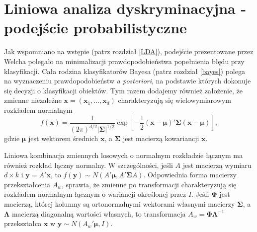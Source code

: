 \documentclass[]{book}
\theoremstyle{plain}
\theoremstyle{definition}
\theoremstyle{definition}
\theoremstyle{definition}
\theoremstyle{definition}
\theoremstyle{remark}
\let\BeginKnitrBlock\begin \let\EndKnitrBlock\end
\begin{document}
\hypertarget{liniowa-analiza-dyskryminacyjna---podejscie-probabilistyczne}{%
\section{Liniowa analiza dyskryminacyjna - podejście probabilistyczne}\label{liniowa-analiza-dyskryminacyjna---podejscie-probabilistyczne}}

Jak wspomniano na wstępie (patrz rozdział \ref{LDA}), podejście prezentowane przez Welcha polegało na minimalizacji prawdopodobieństwa popełnienia błędu przy klasyfikacji. Cała rodzina klasyfikatorów Bayesa (patrz rozdział \ref{bayes}) polega na wyznaczeniu prawdopodobieństw \emph{a posteriori}, na podstawie których dokonuje się decyzji o klasyfikacji obiektów. Tym razem dodajemy również założenie, że zmienne niezależne \(\boldsymbol{x}=(\boldsymbol{x}_1,\ldots,\boldsymbol{x}_d)\) charakteryzują się wielowymiarowym rozkładem normalnym
\begin{equation}
    f(\boldsymbol{x}) = \frac{1}{(2\pi)^{d/2}|\boldsymbol{\Sigma}|^{1/2}}\exp\left[-\frac{1}{2}(\boldsymbol{x}-\boldsymbol{\mu})'\boldsymbol{\Sigma}(\boldsymbol{x}-\boldsymbol{\mu})\right],
    \label{eq:mnv}
\end{equation}
gdzie \(\boldsymbol{\mu}\) jest wektorem średnich \(\boldsymbol{x}\), a \(\boldsymbol{\Sigma}\) jest macierzą kowariancji \(\boldsymbol{x}\).

\BeginKnitrBlock{remark}
{}Liniowa kombinacja zmiennych losowych o normalnym rozkładzie łącznym ma również rozkład łączny normalny. W szczególności, jeśli \(A\) jest macierzą wymiaru \(d\times k\) i \(\boldsymbol{y} = A'\boldsymbol{x}\), to \(f(\boldsymbol{y})\sim N(A'\boldsymbol{\mu}, A'\boldsymbol{\Sigma}A)\). Odpowiednia forma macierzy przekształcenia \(A_w\), sprawia, że zmienne po transformacji charakteryzują się rozkładem normalnym łącznym o wariancji określonej przez \(I\). Jeśli \(\boldsymbol{\Phi}\) jest macierzą, której kolumny są ortonormalnymi wektorami własnymi macierzy \(\boldsymbol{\Sigma}\), a \(\boldsymbol{\Lambda}\) macierzą diagonalną wartości własnych, to transformacja \(A_w=\boldsymbol{\Phi}\boldsymbol{\Lambda}^{-1}\) przekształca \(\boldsymbol{x}\) w \(\boldsymbol{y}\sim N(A_w'\boldsymbol{\mu}, I)\).
\EndKnitrBlock{remark}
\end{document}
